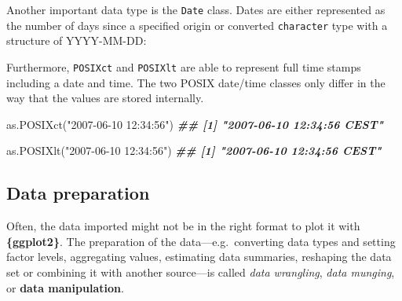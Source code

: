 \documentclass[
]{krantz}
\makeatletter
\newenvironment{Shaded}{\begin{snugshade}}{\end{snugshade}}
\newcommand{\AttributeTok}[1]{\textcolor[rgb]{0.61,0.61,0.61}{#1}}
\newcommand{\DecValTok}[1]{\textcolor[rgb]{0.06,0.06,0.06}{#1}}
\newcommand{\DocumentationTok}[1]{\textcolor[rgb]{0.37,0.37,0.37}{\textbf{\textit{#1}}}}
\newcommand{\FunctionTok}[1]{\textcolor[rgb]{0,0,0}{#1}}
\newcommand{\NormalTok}[1]{#1}
\newcommand{\SpecialCharTok}[1]{\textcolor[rgb]{0,0,0}{#1}}
\newcommand{\StringTok}[1]{\textcolor[rgb]{0.5,0.5,0.5}{#1}}
\newenvironment{kframe}{%
\medskip{}
\setlength{\fboxsep}{.8em}
 \def\at@end@of@kframe{}%
 \ifinner\ifhmode%
  \def\at@end@of@kframe{\end{minipage}}%
  \begin{minipage}{\columnwidth}%
 \fi\fi%
 \def\FrameCommand##1{\hskip\@totalleftmargin \hskip-\fboxsep
 \colorbox{shadecolor}{##1}\hskip-\fboxsep
     \hskip-\linewidth \hskip-\@totalleftmargin \hskip\columnwidth}%
 \MakeFramed {\advance\hsize-\width
   \@totalleftmargin\z@ \linewidth\hsize
   \@setminipage}}%
 {\par\unskip\endMakeFramed%
 \at@end@of@kframe}
\renewenvironment{Shaded}{\begin{kframe}}{\end{kframe}}
\makeatother
\begin{document}
Another important data type is the \texttt{Date} class. Dates are either represented as the number of days since a specified origin or converted \texttt{character} type with a structure of YYYY-MM-DD:

\begin{Shaded}
\end{Shaded}

Furthermore, \texttt{POSIXct} and \texttt{POSIXlt} are able to represent full time stamps including a date and time. The two POSIX date/time classes only differ in the way that the values are stored internally.

\begin{Shaded}
\begin{Highlighting}[]
\FunctionTok{as.POSIXct}\NormalTok{(}\StringTok{"2007{-}06{-}10 12:34:56"}\NormalTok{)}
\DocumentationTok{\#\# [1] "2007{-}06{-}10 12:34:56 CEST"}

\FunctionTok{as.POSIXlt}\NormalTok{(}\StringTok{"2007{-}06{-}10 12:34:56"}\NormalTok{)}
\DocumentationTok{\#\# [1] "2007{-}06{-}10 12:34:56 CEST"}
\end{Highlighting}
\end{Shaded}

\hypertarget{preparation}{%
\subsection{Data preparation}\label{preparation}}

Often, the data imported might not be in the right format to plot it with \textbf{\{ggplot2\}}. The preparation of the data---e.g.~converting data types and setting factor levels, aggregating values, estimating data summaries, reshaping the data set or combining it with another source---is called \emph{data wrangling}, \emph{data munging}, or \textbf{data manipulation}.
\end{document}

